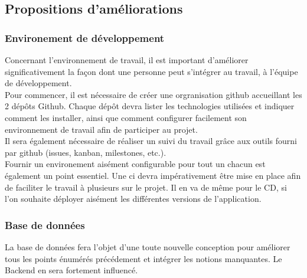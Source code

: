 \documentclass[
    iai, %
    il, %
]{heig-tb}
\begin{document}
\subsection{Propositions d'améliorations}

\subsubsection{Environement de développement}
Concernant l'environnement de travail, il est important d'améliorer significativement la façon dont
une personne peut s'intégrer au travail, à l'équipe de développement.\\
Pour commencer, il est nécessaire de créer une orgranisation \Gls{github} accueillant les 2 dépôts Github.
Chaque dépôt devra lister les technologies utilisées et indiquer comment les installer, ainsi que
comment configurer facilement son environnement de travail afin de participer au projet.\\
Il sera également nécessaire de réaliser un suivi du travail grâce aux outils fourni par \Gls{github} (issues, kanban, milestones, etc.).\\
Fournir un environement aisément configurable pour tout un chacun est également un point essentiel.
Une \Gls{ci} devra impérativement être mise en place afin de faciliter le travail à plusieurs sur le projet. Il en va de même pour le CD, si l'on souhaite déployer aisément les différentes versions de l'application.

\newpage

\subsubsection{Base de données}
La base de données fera l'objet d'une toute nouvelle conception pour améliorer tous les points énumérés précédement et intégrer les notions manquantes. Le Backend en sera fortement influencé.
\end{document}
